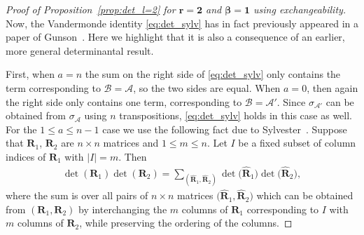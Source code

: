 \documentclass[pdftex]{sigma}
\numberwithin{equation}{section}
\theoremstyle{definition}
\newcommand{\cB}{\mathcal{B}}
\newcommand{\cA}{\mathcal{A}}
\newcommand{\mbf}[1]{\mathbf{#1}}
\begin{document}
\begin{proof}[Proof of Proposition~\ref{prop:det_l=2} for $\boldsymbol{ r\!=2}$ and $\boldsymbol{\beta\!=1}$ using exchangeability]
Now, the Vandermonde identity \eqref{eq:det_sylv} has in fact previously appeared in a
paper of Gunson~\cite{Gunson}. Here we highlight that it is also a consequence of an earlier, more general determinantal result.

First, when $a=n$ the sum on the right side
of \eqref{eq:det_sylv} only contains the term corresponding to $\cB=\cA$, so the two sides are equal. When $a=0$, then again the right side only contains one term, corresponding to $\cB=\cA'$. Since $\sigma_{\cA'}$ can be obtained from $\sigma_{\cA}$ using $n$ transpositions, \eqref{eq:det_sylv} holds in this case as well.
For the $1\le a\le n-1$ case we use the following fact due to Sylvester~\cite{Sylvester1851}.
Suppose that $\mbf{R}_1$, $\mbf{R}_2$ are $n\times n$ matrices and $1\le m\le n$. Let $I$ be a fixed subset of column indices of $\mbf{R}_1$ with $|I|=m$.
Then
\begin{align}\label{eq:Sylvester}
 \det(\mbf{R}_1) \det(\mbf{R}_2)=\sum_{(\widehat{\mbf{R}}_1, \widehat{\mbf{R}}_2)}
 \det\bigl(\widehat{\mbf{R}}_1\bigr) \det\bigl( \widehat{\mbf{R}}_2\bigr),
\end{align}
where the sum is over all pairs of $n\times n$ matrices $\bigl(\widehat{\mbf{R}}_1, \widehat{\mbf{R}}_2\bigr)$
which can be obtained from $(\mbf{R}_1, \mbf{R}_2)$ by interchanging the $m$ columns of $\mbf{R}_1$ corresponding to $I$ with $m$ columns of $\mbf{R}_2$, while preserving the ordering of the columns.


\end{proof}
\end{document}
